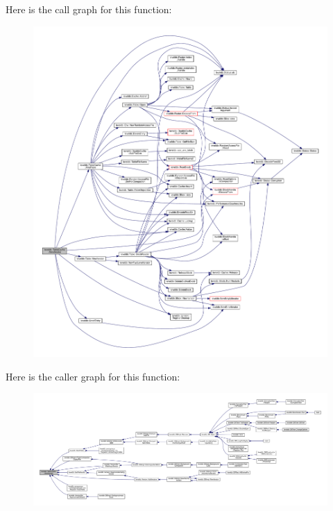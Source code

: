 Here is the call graph for this function\+:\nopagebreak
\begin{figure}[H]
\begin{center}
\leavevmode
\includegraphics[width=350pt]{classleveldb_1_1_table_cache_a6a7d41238620ed3adcb4b9ac776500d7_cgraph}
\end{center}
\end{figure}




Here is the caller graph for this function\+:
\nopagebreak
\begin{figure}[H]
\begin{center}
\leavevmode
\includegraphics[width=350pt]{classleveldb_1_1_table_cache_a6a7d41238620ed3adcb4b9ac776500d7_icgraph}
\end{center}
\end{figure}


